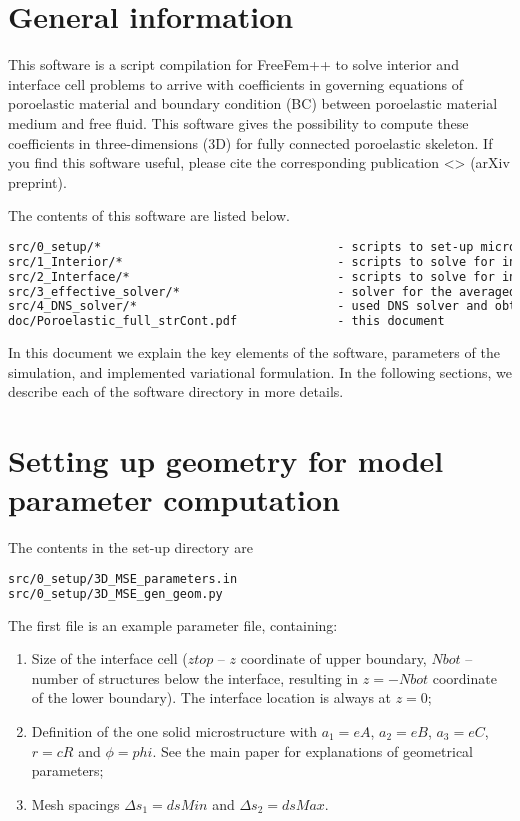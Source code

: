 \documentclass[12pt,a4paper]{article}
\begin{document}
\sloppy

\section{General information}

This software is a script compilation for FreeFem++ to solve interior and interface cell problems to arrive with coefficients in governing equations of poroelastic material and boundary condition (BC) between poroelastic material medium and free fluid. This software gives the possibility to compute these coefficients in three-dimensions (3D) for fully connected poroelastic skeleton. If you find this software useful, please cite the corresponding publication <> (arXiv preprint).

The contents of this software are listed below.
\begin{lstlisting}[language=tex]
src/0_setup/*                                 - scripts to set-up microscale geometry
src/1_Interior/*                              - scripts to solve for interior properties
src/2_Interface/*                             - scripts to solve for interface coefficients
src/3_effective_solver/*                      - solver for the averaged fields in the problem
src/4_DNS_solver/*                            - used DNS solver and obtained fields
doc/Poroelastic_full_strCont.pdf              - this document
\end{lstlisting}

In this document we explain the key elements of the software, parameters of the simulation, and implemented variational formulation. In the following sections, we describe each of the software directory in more details.

\section{Setting up geometry for model parameter computation} \label{sec:presim-start}

The contents in the set-up directory are
\begin{lstlisting}[language=tex]
src/0_setup/3D_MSE_parameters.in
src/0_setup/3D_MSE_gen_geom.py
\end{lstlisting}

The first file is an example parameter file, containing:
\begin{enumerate}
    \item Size of the interface cell ($ztop$ -- $z$ coordinate of upper boundary, $Nbot$ -- number of structures below the interface, resulting in $z = - Nbot$ coordinate of the lower boundary). The interface location is always at $z = 0$;
	\item Definition of the one solid microstructure with $a_1 = eA$, $a_2 = eB$, $a_3 = eC$, $r = cR$ and $\phi = phi$. See the main paper for explanations of geometrical parameters;
    \item Mesh spacings $\Delta s_1 = dsMin$ and $\Delta s_2 = dsMax$.
\end{enumerate}
\end{document}
